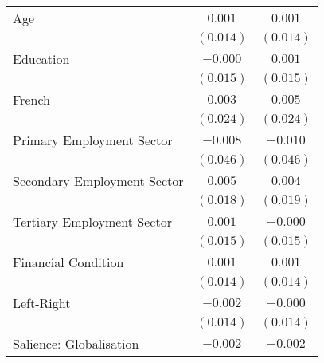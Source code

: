 \begin{center}
\begin{tiny}
\begin{longtable}{l@{} c@{} c@{}}
\quad Age                                                                  & $0.001$          & $0.001$          \\
                                                                           & $(0.014)$        & $(0.014)$        \\
\quad Education                                                            & $-0.000$         & $0.001$          \\
                                                                           & $(0.015)$        & $(0.015)$        \\
\quad French                                                               & $0.003$          & $0.005$          \\
                                                                           & $(0.024)$        & $(0.024)$        \\
\quad Primary Employment Sector                                            & $-0.008$         & $-0.010$         \\
                                                                           & $(0.046)$        & $(0.046)$        \\
\quad Secondary Employment Sector                                          & $0.005$          & $0.004$          \\
                                                                           & $(0.018)$        & $(0.019)$        \\
\quad Tertiary Employment Sector                                           & $0.001$          & $-0.000$         \\
                                                                           & $(0.015)$        & $(0.015)$        \\
\quad Financial Condition                                                  & $0.001$          & $0.001$          \\
                                                                           & $(0.014)$        & $(0.014)$        \\
\quad Left-Right                                                           & $-0.002$         & $-0.000$         \\
                                                                           & $(0.014)$        & $(0.014)$        \\
\quad Salience: Globalisation                                              & $-0.002$         & $-0.002$         \\

\end{longtable}
\end{tiny}
\end{center}
